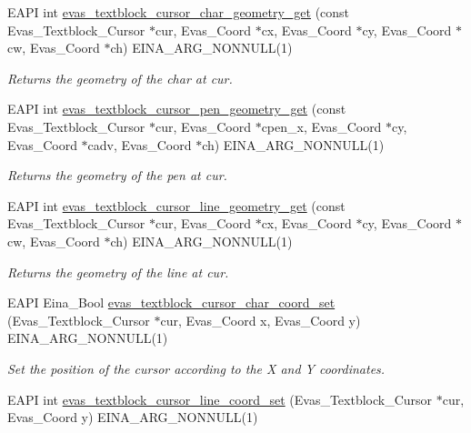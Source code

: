 \begin{DoxyCompactItemize}
EAPI int \hyperlink{group__Evas__Object__Textblock_ga47950e666e252bbf0ad9d46b59e74269}{evas\_\-textblock\_\-cursor\_\-char\_\-geometry\_\-get} (const Evas\_\-Textblock\_\-Cursor $\ast$cur, Evas\_\-Coord $\ast$cx, Evas\_\-Coord $\ast$cy, Evas\_\-Coord $\ast$cw, Evas\_\-Coord $\ast$ch) EINA\_\-ARG\_\-NONNULL(1)
\begin{DoxyCompactList}\small\item\em Returns the geometry of the char at cur. \item\end{DoxyCompactList}\item 
EAPI int \hyperlink{group__Evas__Object__Textblock_ga07130c3e5323cc4aab5740e926221105}{evas\_\-textblock\_\-cursor\_\-pen\_\-geometry\_\-get} (const Evas\_\-Textblock\_\-Cursor $\ast$cur, Evas\_\-Coord $\ast$cpen\_\-x, Evas\_\-Coord $\ast$cy, Evas\_\-Coord $\ast$cadv, Evas\_\-Coord $\ast$ch) EINA\_\-ARG\_\-NONNULL(1)
\begin{DoxyCompactList}\small\item\em Returns the geometry of the pen at cur. \item\end{DoxyCompactList}\item 
EAPI int \hyperlink{group__Evas__Object__Textblock_gaa49a0235809d49fb5f988253050dd101}{evas\_\-textblock\_\-cursor\_\-line\_\-geometry\_\-get} (const Evas\_\-Textblock\_\-Cursor $\ast$cur, Evas\_\-Coord $\ast$cx, Evas\_\-Coord $\ast$cy, Evas\_\-Coord $\ast$cw, Evas\_\-Coord $\ast$ch) EINA\_\-ARG\_\-NONNULL(1)
\begin{DoxyCompactList}\small\item\em Returns the geometry of the line at cur. \item\end{DoxyCompactList}\item 
EAPI Eina\_\-Bool \hyperlink{group__Evas__Object__Textblock_ga216d7d74aae2d58f0cc42bf1a0291b00}{evas\_\-textblock\_\-cursor\_\-char\_\-coord\_\-set} (Evas\_\-Textblock\_\-Cursor $\ast$cur, Evas\_\-Coord x, Evas\_\-Coord y) EINA\_\-ARG\_\-NONNULL(1)
\begin{DoxyCompactList}\small\item\em Set the position of the cursor according to the X and Y coordinates. \item\end{DoxyCompactList}\item 
EAPI int \hyperlink{group__Evas__Object__Textblock_gab730b9223f43f4bf255f7b3bd44f3ddb}{evas\_\-textblock\_\-cursor\_\-line\_\-coord\_\-set} (Evas\_\-Textblock\_\-Cursor $\ast$cur, Evas\_\-Coord y) EINA\_\-ARG\_\-NONNULL(1)

\end{DoxyCompactItemize}
